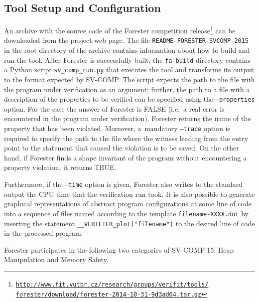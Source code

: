 \subsection{Tool Setup and Configuration}\label{sec:tool_setup}

An archive with the source code of the Forester competition
release\footnote{\href{http://www.fit.vutbr.cz/research/groups/verifit/tools/forester/download/forester-2014-10-31-9d3ad64.tar.gz}{\texttt{http://www.fit.vutbr.cz/research/groups/verifit/tools/}
\texttt{forester/download/forester-2014-10-31-9d3ad64.tar.gz}}}
can be downloaded from the project web page.
The file \texttt{README-FORESTER-SVCOMP-2015} in the root directory of the
archive contains information about how to build and run the tool.
After Forester is successfully built, the \texttt{fa\_build} directory contains
a Python script \texttt{sv\_comp\_run.py} that executes the tool and transforms
its output to the format expected by SV-COMP.
The script expects the path to the file with the program under verification as an
argument; further, the path to a file with a description of the properties to be
verified can be specified using the \texttt{--properties} option.
For the case the answer of Forester is \textsf{FALSE} (i.e.~a real error is
encountered in the program under verification), Forester returns the name of the
property that has been violated.
Moreover, a~mandatory \texttt{--trace} option is required to specify the path to the file where the
witness leading from the entry point to the statement that caused
the violation is to be saved.
On the other hand, if Forester finds a shape invariant of the program without
encountering a property violation, it returns \textsf{TRUE}.

Furthermore, if the \texttt{--time} option is given, Forester also writes to the standard output the
CPU time that the verification run took.
It is also possible to generate graphical representations of abstract
program configurations at some line of code into a sequence of files named
according to the template \texttt{filename-XXXX.dot} by inserting the statement
\texttt{\_\_VERIFIER\_plot("filename")} to the desired line of code in the
processed program.

Forester participates in the following two categories of SV-COMP'15: Heap
Manipulation and Memory Safety.


